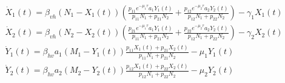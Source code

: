 \begin{equation}
  \label{eq:MigrationProblem}
  \begin{split}
    &\dot{X}_1(t) = \beta_{vh} (N_1-X_1(t)) \left(\frac{p_{11} e^{-\mu_1 \tau} a_1  Y_1(t)}{p_{11} N_1 + p_{21} N_2} + \frac{p_{12} e^{-\mu_2 \tau} a_2  Y_2(t)}{p_{12} N_1 + p_{22} N_2}\right) - \gamma_1 X_1(t) \\
    &\dot{X}_2(t) = \beta_{vh} (N_2-X_2(t)) \left(\frac{p_{21} e^{-\mu_1 \tau} a_1  Y_1(t)}{p_{11} N_1 + p_{21} N_2} + \frac{p_{22} e^{-\mu_2 \tau} a_2  Y_2(t)}{p_{12} N_1 + p_{22} N_2}\right) - \gamma_2 X_2(t) \\
    &\dot{Y}_1(t) = \beta_{hv} a_1 (M_1-Y_1(t)) \frac{p_{11}  X_1(t) + p_{21}  X_2(t)}{p_{11} N_1 + p_{21} N_2} - \mu_1 Y_1(t) \\
    &\dot{Y}_2(t) = \beta_{hv} a_2 (M_2-Y_2(t)) \frac{p_{12}  X_1(t) + p_{22}  X_2(t)}{p_{12} N_1 + p_{22} N_2} - \mu_2 Y_2(t) \\
  \end{split}
\end{equation}

